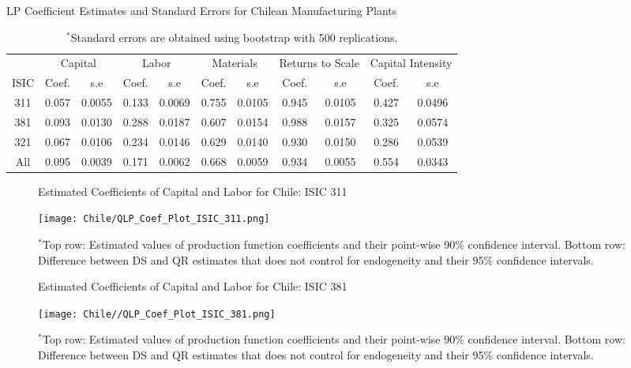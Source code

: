 \documentclass[12pt]{article}
\begin{document}
\begin{appendices}
\begin{table}[H]
\centering
\caption{LP Coefficient Estimates and Standard Errors for Chilean Manufacturing Plants}
\small
\begin{tabular}{ccccccccccc}
  \hline\hline & \multicolumn{2}{c}{Capital} & \multicolumn{2}{c}{Labor} & \multicolumn{2}{c}{Materials} & \multicolumn{2}{c}{Returns to Scale} & \multicolumn{2}{c}{Capital Intensity}\\ \cmidrule(lr){2-3} \cmidrule(lr){4-5} \cmidrule(lr){6-7} \cmidrule(lr){8-9} \cmidrule(lr){10-11}ISIC & Coef. & s.e & Coef. & s.e & Coef. & s.e & Coef. & s.e & Coef. & s.e \\ 
  \hline
311 & 0.057 & 0.0055 & 0.133 & 0.0069 & 0.755 & 0.0105 & 0.945 & 0.0105 & 0.427 & 0.0496 \\ 
  381 & 0.093 & 0.0130 & 0.288 & 0.0187 & 0.607 & 0.0154 & 0.988 & 0.0157 & 0.325 & 0.0574 \\ 
  321 & 0.067 & 0.0106 & 0.234 & 0.0146 & 0.629 & 0.0140 & 0.930 & 0.0150 & 0.286 & 0.0539 \\ 
  All & 0.095 & 0.0039 & 0.171 & 0.0062 & 0.668 & 0.0059 & 0.934 & 0.0055 & 0.554 & 0.0343 \\ 
   \hline
\end{tabular}
\caption*{\footnotesize $^{*}$Standard errors are obtained using bootstrap with 500 replications.}
\label{CHLLP}
\end{table}

\begin{figure}[H]
\centering
\caption{Estimated Coefficients of Capital and Labor for Chile: ISIC 311}
\texttt{[image: Chile/QLP\_Coef\_Plot\_ISIC\_311.png]}
\caption*{\footnotesize $^{*}$Top row: Estimated values of production function coefficients and their point-wise 90\% confidence interval. Bottom row: Difference between DS and QR estimates that does not control for endogeneity and their 95\% confidence intervals.}
\label{fig:QLPCHL311}
\end{figure}

\begin{figure}[H]
\centering
\caption{Estimated Coefficients of Capital and Labor for Chile: ISIC 381}
\texttt{[image: Chile//QLP\_Coef\_Plot\_ISIC\_381.png]}
\caption*{\footnotesize $^{*}$Top row: Estimated values of production function coefficients and their point-wise 90\% confidence interval. Bottom row: Difference between DS and QR estimates that does not control for endogeneity and their 95\% confidence intervals.}
\label{fig:QLPCHL381}
\end{figure}


\end{appendices}
\end{document}

